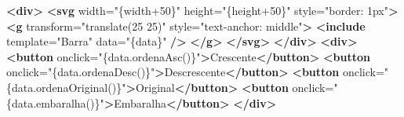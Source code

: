 \documentclass[]{article}
\date{}
\newenvironment{Shaded}{}{}
\newcommand{\KeywordTok}[1]{\textcolor[rgb]{0.00,0.44,0.13}{\textbf{{#1}}}}
\newcommand{\StringTok}[1]{\textcolor[rgb]{0.25,0.44,0.63}{{#1}}}
\newcommand{\OtherTok}[1]{\textcolor[rgb]{0.00,0.44,0.13}{{#1}}}
\newcommand{\NormalTok}[1]{{#1}}
\begin{document}
\begin{Shaded}
\begin{Highlighting}[]
\KeywordTok{<div>}
    \KeywordTok{<svg}\OtherTok{ width=}\StringTok{"\{width+50\}"}\OtherTok{ height=}\StringTok{"\{height+50\}"}\OtherTok{ style=}\StringTok{"border: 1px"}\KeywordTok{>}
        \KeywordTok{<g}\OtherTok{ transform=}\StringTok{"translate(25 25)"}\OtherTok{ style=}\StringTok{"text-anchor: middle"}\KeywordTok{>}
            \KeywordTok{<include}\OtherTok{ template=}\StringTok{"Barra"}\OtherTok{ data=}\StringTok{"\{data\}"} \KeywordTok{/>}
        \KeywordTok{</g>}
    \KeywordTok{</svg>}
\KeywordTok{</div>}
\KeywordTok{<div>}
    \KeywordTok{<button}\OtherTok{ onclick=}\StringTok{"\{data.ordenaAsc()\}"}\KeywordTok{>}\NormalTok{Crescente}\KeywordTok{</button>}
    \KeywordTok{<button}\OtherTok{ onclick=}\StringTok{"\{data.ordenaDesc()\}"}\KeywordTok{>}\NormalTok{Descrescente}\KeywordTok{</button>}
    \KeywordTok{<button}\OtherTok{ onclick=}\StringTok{"\{data.ordenaOriginal()\}"}\KeywordTok{>}\NormalTok{Original}\KeywordTok{</button>}
    \KeywordTok{<button}\OtherTok{ onclick=}\StringTok{"\{data.embaralha()\}"}\KeywordTok{>}\NormalTok{Embaralha}\KeywordTok{</button>}
\KeywordTok{</div>}
\end{Highlighting}
\end{Shaded}
\end{document}
